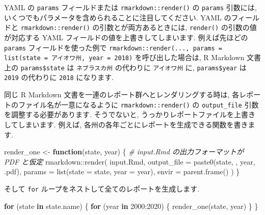 \documentclass[
  11pt,
  lualatex,
  ja=standard]{bxjsreport}
\newenvironment{Shaded}{\begin{snugshade}}{\end{snugshade}}
\newcommand{\AttributeTok}[1]{\textcolor[rgb]{0.77,0.63,0.00}{#1}}
\newcommand{\CommentTok}[1]{\textcolor[rgb]{0.56,0.35,0.01}{\textit{#1}}}
\newcommand{\ControlFlowTok}[1]{\textcolor[rgb]{0.13,0.29,0.53}{\textbf{#1}}}
\newcommand{\DecValTok}[1]{\textcolor[rgb]{0.00,0.00,0.81}{#1}}
\newcommand{\FunctionTok}[1]{\textcolor[rgb]{0.00,0.00,0.00}{#1}}
\newcommand{\NormalTok}[1]{#1}
\newcommand{\OtherTok}[1]{\textcolor[rgb]{0.56,0.35,0.01}{#1}}
\newcommand{\SpecialCharTok}[1]{\textcolor[rgb]{0.00,0.00,0.00}{#1}}
\newcommand{\StringTok}[1]{\textcolor[rgb]{0.31,0.60,0.02}{#1}}
\begin{document}
YAML の \texttt{params} フィールドまたは \texttt{rmarkdown::render()} の \texttt{params} 引数には, いくつでもパラメータを含められることに注目してください. YAML のフィールドと \texttt{rmarkdown::render()} の引数とが両方あるときには, \texttt{render()} の引数の値が対応する YAML フィールドの値を上書きしてしまいます. 例えば先ほどの \texttt{params} フィールドを使った例で \texttt{rmarkdown::render(..., params = list(state = \textquotesingle{}アイオワ州\textquotesingle{},\ year\ =\ 2018)} を呼び出した場合は, R Markdown 文書上の \texttt{params\$state} は \texttt{ネブラスカ州} の代わりに \texttt{アイオワ州} に, \texttt{params\$year} は \texttt{2019} の代わりに \texttt{2018} になります.

同じ R Markdown 文書を一連のレポート群へとレンダリングする時は, 各レポートのファイル名が一意になるように \texttt{rmarkdown::render()} の \texttt{output\_file} 引数を調整する必要があります. そうでないと, うっかりレポートファイルを上書きしてしまいます. 例えば, 各州の各年ごとにレポートを生成できる関数を書きます.

\begin{Shaded}
\begin{Highlighting}[numbers=left,,]
\NormalTok{render\_one }\OtherTok{\textless{}{-}} \ControlFlowTok{function}\NormalTok{(state, year) \{}
  \CommentTok{\# input.Rmd の出力フォーマットが PDF と仮定}
\NormalTok{  rmarkdown}\SpecialCharTok{::}\FunctionTok{render}\NormalTok{(}
    \StringTok{\textquotesingle{}input.Rmd\textquotesingle{}}\NormalTok{,}
    \AttributeTok{output\_file =} \FunctionTok{paste0}\NormalTok{(state, }\StringTok{\textquotesingle{}{-}\textquotesingle{}}\NormalTok{, year, }\StringTok{\textquotesingle{}.pdf\textquotesingle{}}\NormalTok{),}
    \AttributeTok{params =} \FunctionTok{list}\NormalTok{(}\AttributeTok{state =}\NormalTok{ state, }\AttributeTok{year =}\NormalTok{ year),}
    \AttributeTok{envir =} \FunctionTok{parent.frame}\NormalTok{()}
\NormalTok{  )}
\NormalTok{\}}
\end{Highlighting}
\end{Shaded}

そして \texttt{for} ループをネストして全てのレポートを生成します.

\begin{Shaded}
\begin{Highlighting}[numbers=left,,]
\ControlFlowTok{for}\NormalTok{ (state }\ControlFlowTok{in}\NormalTok{ state.name) \{}
  \ControlFlowTok{for}\NormalTok{ (year }\ControlFlowTok{in} \DecValTok{2000}\SpecialCharTok{:}\DecValTok{2020}\NormalTok{) \{}
    \FunctionTok{render\_one}\NormalTok{(state, year)}
\NormalTok{  \}}
\NormalTok{\}}
\end{Highlighting}
\end{Shaded}
\end{document}
